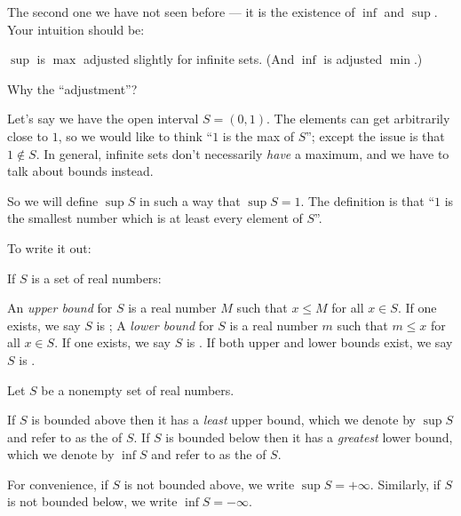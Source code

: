 The second one we have not seen before --- it is the
existence of $\inf$ and $\sup$.
Your intuition should be:
\begin{moral}
	$\sup$ is $\max$ adjusted slightly for infinite sets.
	(And $\inf$ is adjusted $\min$.)
\end{moral}
Why the ``adjustment''?
\begin{example}
	Let's say we have the open interval $S = (0,1)$.
	The elements can get arbitrarily close to $1$,
	so we would like to think ``$1$ is the max of $S$'';
	except the issue is that $1 \notin S$.
	In general, infinite sets don't necessarily \emph{have}
	a maximum, and we have to talk about bounds instead.

	So we will define $\sup S$ in such a way that $\sup S = 1$.
	The definition is that ``$1$ is the smallest number
	which is at least every element of $S$''.
\end{example}
To write it out:
\begin{definition}
	If $S$ is a set of real numbers:
	\begin{itemize}
		\ii An \emph{upper bound} for $S$ is a real number $M$
		such that $x \le M$ for all $x \in S$.
		If one exists, we say $S$ is ;
		\ii A \emph{lower bound} for $S$ is a real number $m$
		such that $m \le x$ for all $x \in S$.
		If one exists, we say $S$ is .
		\ii If both upper and lower bounds exist,
		we say $S$ is .
	\end{itemize}
\end{definition}
\begin{theorem}
	\label{thm:inf_sup}
	Let $S$ be a nonempty set of real numbers.
	\begin{itemize}
		\ii If $S$ is bounded above
		then it has a \emph{least} upper bound,
		which we denote by $\sup S$
		and refer to as the  of $S$.
		\ii If $S$ is bounded below
		then it has a \emph{greatest} lower bound,
		which we denote by $\inf S$
		and refer to as the  of $S$.
	\end{itemize}
\end{theorem}

\begin{definition}
	For convenience, if $S$ is not bounded above, we write $\sup S = +\infty$.
	Similarly, if $S$ is not bounded below, we write $\inf S = -\infty$.
\end{definition}

